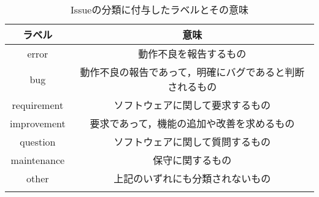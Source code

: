 
\begin{table}[p] %
	\centering
	\caption{Issueの分類に付与したラベルとその意味}
	\label{tab:label_meaning}
	\begin{tabular}{cc} %
		\Hline
		ラベル & 意味 \\\hline
		error & 動作不良を報告するもの \\
		bug & 動作不良の報告であって，明確にバグであると判断されるもの \\
		requirement & ソフトウェアに関して要求するもの \\
		improvement & 要求であって，機能の追加や改善を求めるもの \\
		question & ソフトウェアに関して質問するもの \\
		maintenance & 保守に関するもの \\
		other & 上記のいずれにも分類されないもの \\\Hline
	\end{tabular}
\end{table}

